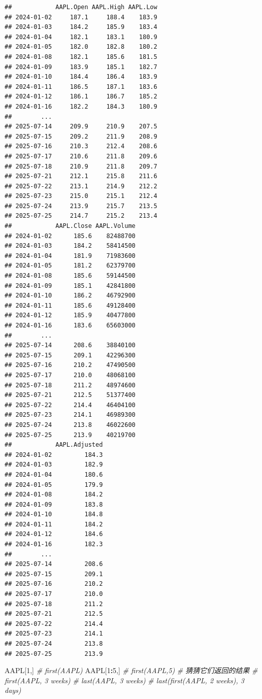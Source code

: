 \documentclass[]{ctexbook}
\newenvironment{Shaded}{\begin{snugshade}}{\end{snugshade}}
\newcommand{\CommentTok}[1]{\textcolor[rgb]{0.56,0.35,0.01}{\textit{#1}}}
\newcommand{\DecValTok}[1]{\textcolor[rgb]{0.00,0.00,0.81}{#1}}
\newcommand{\NormalTok}[1]{#1}
\newcommand{\SpecialCharTok}[1]{\textcolor[rgb]{0.81,0.36,0.00}{\textbf{#1}}}
\begin{document}
\begin{verbatim}
##            AAPL.Open AAPL.High AAPL.Low
## 2024-01-02     187.1     188.4    183.9
## 2024-01-03     184.2     185.9    183.4
## 2024-01-04     182.1     183.1    180.9
## 2024-01-05     182.0     182.8    180.2
## 2024-01-08     182.1     185.6    181.5
## 2024-01-09     183.9     185.1    182.7
## 2024-01-10     184.4     186.4    183.9
## 2024-01-11     186.5     187.1    183.6
## 2024-01-12     186.1     186.7    185.2
## 2024-01-16     182.2     184.3    180.9
##        ...                             
## 2025-07-14     209.9     210.9    207.5
## 2025-07-15     209.2     211.9    208.9
## 2025-07-16     210.3     212.4    208.6
## 2025-07-17     210.6     211.8    209.6
## 2025-07-18     210.9     211.8    209.7
## 2025-07-21     212.1     215.8    211.6
## 2025-07-22     213.1     214.9    212.2
## 2025-07-23     215.0     215.1    212.4
## 2025-07-24     213.9     215.7    213.5
## 2025-07-25     214.7     215.2    213.4
##            AAPL.Close AAPL.Volume
## 2024-01-02      185.6    82488700
## 2024-01-03      184.2    58414500
## 2024-01-04      181.9    71983600
## 2024-01-05      181.2    62379700
## 2024-01-08      185.6    59144500
## 2024-01-09      185.1    42841800
## 2024-01-10      186.2    46792900
## 2024-01-11      185.6    49128400
## 2024-01-12      185.9    40477800
## 2024-01-16      183.6    65603000
##        ...                       
## 2025-07-14      208.6    38840100
## 2025-07-15      209.1    42296300
## 2025-07-16      210.2    47490500
## 2025-07-17      210.0    48068100
## 2025-07-18      211.2    48974600
## 2025-07-21      212.5    51377400
## 2025-07-22      214.4    46404100
## 2025-07-23      214.1    46989300
## 2025-07-24      213.8    46022600
## 2025-07-25      213.9    40219700
##            AAPL.Adjusted
## 2024-01-02         184.3
## 2024-01-03         182.9
## 2024-01-04         180.6
## 2024-01-05         179.9
## 2024-01-08         184.2
## 2024-01-09         183.8
## 2024-01-10         184.8
## 2024-01-11         184.2
## 2024-01-12         184.6
## 2024-01-16         182.3
##        ...              
## 2025-07-14         208.6
## 2025-07-15         209.1
## 2025-07-16         210.2
## 2025-07-17         210.0
## 2025-07-18         211.2
## 2025-07-21         212.5
## 2025-07-22         214.4
## 2025-07-23         214.1
## 2025-07-24         213.8
## 2025-07-25         213.9
\end{verbatim}

\begin{Shaded}
\begin{Highlighting}[]
\NormalTok{AAPL[}\DecValTok{1}\NormalTok{,]}
\CommentTok{\# first(AAPL)}
\NormalTok{AAPL[}\DecValTok{1}\SpecialCharTok{:}\DecValTok{5}\NormalTok{,]}
\CommentTok{\# first(AAPL,5)}
\CommentTok{\# 猜猜它们返回的结果}
\CommentTok{\# first(AAPL, \textquotesingle{}3 weeks\textquotesingle{})}
\CommentTok{\# last(AAPL, \textquotesingle{}{-}3 weeks\textquotesingle{})}
\CommentTok{\# last(first(AAPL, \textquotesingle{}2 weeks\textquotesingle{}), \textquotesingle{}3 days\textquotesingle{})}
\end{Highlighting}
\end{Shaded}
\end{document}
